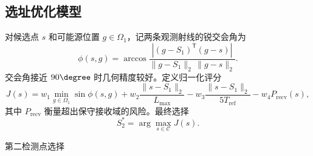\subsection{选址优化模型}

对候选点 \(s\) 和可能源位置 \(g\in\Omega_1\)，记两条观测射线的锐交会角为
\begin{equation}
  \phi(s,g)=\arccos\frac{|(g-S_1)^{\mathsf T}(g-s)|}
  {\|g-S_1\|_2\,\|g-s\|_2}.
\end{equation}
交会角接近 \(90\degree\) 时几何精度较好。定义归一化评分
\begin{equation}
  J(s)=w_1\min_{g\in\Omega_1}\sin\phi(s,g)
  +w_2\frac{\|s-S_1\|_2}{L_{\max}}
  -w_3\frac{\|s-S_1\|_2}{5T_{\mathrm{ref}}}
  -w_4P_{\mathrm{recv}}(s),
\end{equation}
其中 \(P_{\mathrm{recv}}\) 衡量超出保守接收域的风险。最终选择
\begin{equation}
  S_2^*=\arg\max_{s\in\mathcal{C}}J(s).
  \label{eq:p2-objective}
\end{equation}

\begin{modelalgorithm}{第二检测点选择}
  \begin{enumerate}[leftmargin=2.5em]
  \end{enumerate}
\end{modelalgorithm}

